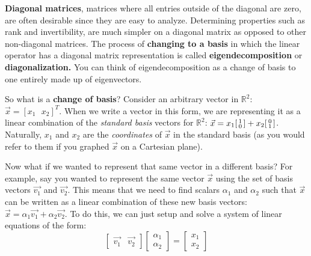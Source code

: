 


\textbf{Diagonal matrices}, matrices where all entries outside of the diagonal are zero, are often desirable since they are easy to analyze.
Determining properties such as rank and invertibility, are much simpler on a diagonal matrix as opposed to other non-diagonal matrices.
The process of \textbf{changing to a basis} in which the linear operator has a diagonal matrix representation is called \textbf{eigendecomposition} or \textbf{diagonalization.} You can think of eigendecomposition as a change of basis to one entirely made up of eigenvectors.

So what is a \textbf{change of basis}? Consider an arbitrary vector in $\mathbb{R}^2$: $\vec{x} = [ x_1 \text{ } x_2 ]^T$.
When we write a vector in this form, we are representing it as a linear combination of the \textit{standard basis} vectors for $\mathbb{R}^2$: $\vec{x} = x_1 \begin{bsmallmatrix} 1 \\ 0 \end{bsmallmatrix} + x_2 \begin{bsmallmatrix} 0 \\ 1 \end{bsmallmatrix}$. Naturally, $x_1$ and $x_2$ are the \textit{coordinates} of $\vec{x}$ in the standard basis (as you would refer to them if you graphed $\vec{x}$ on a Cartesian plane).

Now what if we wanted to represent that same vector in a different basis?
For example, say you wanted to represent the same vector $\vec{x}$ using the set of basis vectors $\vec{v_1}$ and $\vec{v_2}$.
This means that we need to find scalars $\alpha_1$ and $\alpha_2$ such that $\vec{x}$ can be written as a linear combination of these new basis vectors: $\vec{x} = \alpha_1 \vec{v_1} + \alpha_2 \vec{v_2}$.
To do this, we can just setup and solve a system of linear equations of the form:
$$\begin{bmatrix} \vec{v_1} & \vec{v_2} \end{bmatrix} \begin{bmatrix} \alpha_1 \\ \alpha_2 \end{bmatrix} = \begin{bmatrix} x_1 \\ x_2 \end{bmatrix}$$

